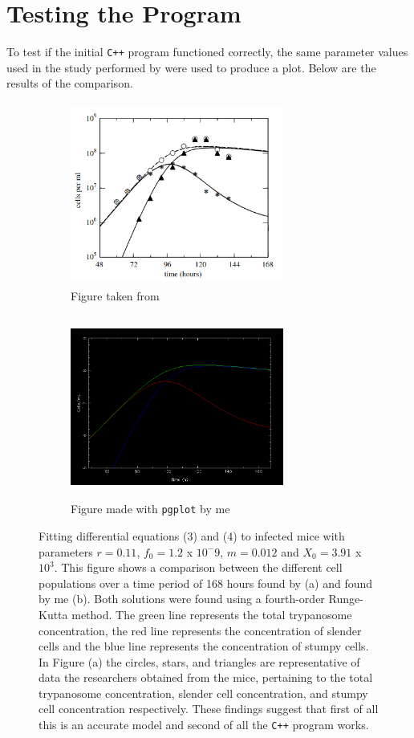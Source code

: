 \documentclass[11pt]{article}
\begin{document}
	\section{Testing the Program}
	
	To test if the initial \texttt{C++} program functioned correctly, the same parameter values used in the study performed by \citep{tyler2001limitation} were used to produce a plot. Below are the results of the comparison. \newline
	
	\begin{figure}[!htb]
		\centering
		\begin{subfigure}{.5\textwidth}
			\centering
			\includegraphics[width=7cm, height=6cm]{plot1.png}
			\caption{Figure taken from \citep{tyler2001limitation}}
			\label{fig:sub1}
		\end{subfigure}%
		\begin{subfigure}{.5\textwidth}
			\centering
			\includegraphics[width=7cm, height=6cm]{plot2.png}
			\caption{Figure made with \texttt{pgplot} by me}
			\label{fig:sub2}
		\end{subfigure}
		\caption{Fitting differential equations (3) and (4) to infected mice with parameters $r = 0.11$, $f_0 = 1.2$ x $10^-9$, $m = 0.012$ and $X_0 = 3.91$ x $10^3$. This figure shows a comparison between the different cell populations over a time period of 168 hours found by \citep{tyler2001limitation} (a) and found by me (b). Both solutions were found using a fourth-order Runge-Kutta method. The green line represents the total trypanosome concentration, the red line represents the concentration of slender cells and the blue line represents the concentration of stumpy cells. In Figure (a) the circles, stars, and triangles are representative of data the researchers obtained from the mice, pertaining to the total trypanosome concentration, slender cell concentration, and stumpy cell concentration respectively. These findings suggest that first of all this is an accurate model and second of all the \texttt{C++} program works.}
		\label{fig:test}
	\end{figure}
\end{document}
